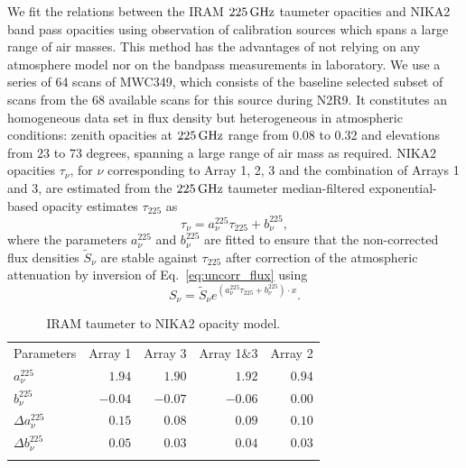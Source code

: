 We fit the relations between the IRAM
$225\,\rm{GHz}$ taumeter opacities and NIKA2 band pass opacities using
observation of calibration sources which spans a large range of air
masses. This method has the advantages of not relying on
any atmosphere model nor on the bandpass measurements in laboratory.
We use a series of 64 scans of MWC349, which consists of the
baseline selected subset of scans from the 68 available scans for
this source during N2R9.
It constitutes an homogeneous data set in flux density but
heterogeneous in atmospheric conditions: zenith opacities at
$225\,\rm{GHz}$ 
range from 0.08 to 0.32 and elevations from $23$ to $73$
degrees, spanning a large range of air mass as required. NIKA2 opacities
$\tau_\nu$, for $\nu$ corresponding
to Array 1, 2, 3 and the combination of Arrays 1 and 3, are estimated
from the $225\,\rm{GHz}$ taumeter median-filtered exponential-based opacity
estimates $\tau_{225}$ as
\begin{equation}  
  \tau_\nu =  a_\nu^{225}\tau_{225} + b_\nu^{225},          
\end{equation}
where the parameters $a_\nu^{225}$ and $b_\nu^{225}$ are fitted to ensure
that the non-corrected flux densities $\tilde{S}_\nu$ are stable against
$\tau_{225}$ after correction of the atmospheric attenuation by
inversion of Eq.~\ref{eq:uncorr_flux} using 
\begin{equation}  
  S_\nu = \tilde{S}_\nu e^{(a_\nu^{225}\tau_{225} + b_\nu^{225}) \cdot x}.
  \label{eq:opacorr_taumeter}
\end{equation}

\begin{table}[!htbp]
  \begin{center}
    \caption[IRAM taumeter to NIKA2 opacity model]{IRAM taumeter to NIKA2 opacity model.}
    \label{tab:tau225-to-taunika}  
    \begin{tabular}{lrrrr}
      \hline
      \hline
      \noalign{\smallskip}
      Parameters & Array 1 & Array 3  & Array 1$\&$3 & Array 2  \\
      \noalign{\smallskip}
      \hline
      \noalign{\smallskip}
      $a_\nu^{225}$         & $1.94$   &  $1.90$ &  $1.92$ & $0.94$ \\
      $b_\nu^{225}$         & $-0.04$  & $-0.07$ & $-0.06$ & $0.00$ \\
      $\Delta a_\nu^{225}$  & $0.15$  & $0.08$  &  $0.09$ & $0.10$ \\
      $\Delta b_\nu^{225}$  & $0.05$  & $0.03$  & $0.04$ & $0.03$ \\
      \noalign{\smallskip}
      \hline
    \end{tabular}
  \end{center}    
\end{table}

